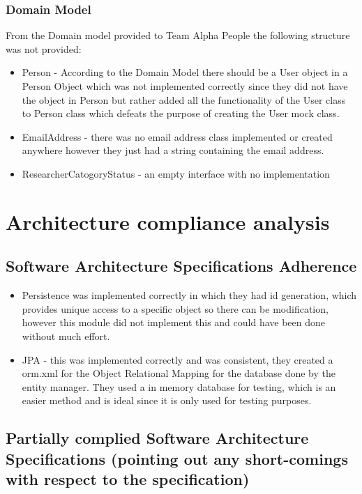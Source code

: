 \documentclass{article}
\begin{document}
	\subsubsection{Domain Model}
	From the Domain model provided to Team Alpha People the following structure was not provided:
	\begin{itemize}
		\item Person - According to the Domain Model there should be a User object in a Person Object which was not implemented correctly since they did not have the object in Person but rather added all the functionality of the User class to Person class which defeats the purpose of creating the User mock class.
		\item EmailAddress - there was no email address class implemented or created anywhere however they just had a string containing the email address.
		\item ResearcherCatogoryStatus - an empty interface with no implementation
	 \end{itemize}

\section{Architecture compliance analysis}
	\subsection{Software Architecture Specifications Adherence}
	\begin{itemize}

	    \item Persistence was implemented correctly in which they had id generation, which provides unique access to a specific object so there can be modification, however this module did not implement this and could have been done without much effort. 
		\item JPA - this was implemented correctly and was consistent, they created a orm.xml for the Object Relational Mapping for the database done by the entity manager. They used a in memory database for testing, which is an easier method and is ideal since it is only used for testing purposes.

	\end{itemize}

	\subsection{Partially complied Software Architecture Specifications (pointing out any short-comings with respect to the specification)}
\end{document}
